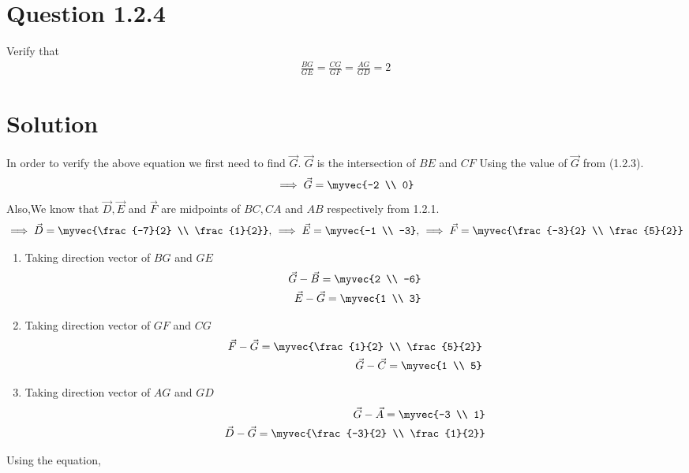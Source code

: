 \documentclass[journal,12pt,twocolumn]{IEEEtran}
\theoremstyle{remark}
\begin{document}
\section{Question 1.2.4}Verify that 
\begin{align}
		\frac{BG}{GE} = 
		\frac{CG}{GF} =
		\frac{AG}{GD} = 2 
\end{align}
\section{Solution}In order to verify the above equation we first need to find $\vec{G}$. 
$\vec{G}$ is the intersection of $BE$ and $CF$
Using the value of $\vec{G}$ from (1.2.3).
\begin{align}
		\implies\vec{G} = \myvec{-2 \\ 0}
\end{align}
Also,We know that $\vec{D}, \vec{E}$ and $\vec{F}$ are midpoints of $BC, CA$ and $AB$ respectively from 1.2.1.
\begin{align}
		\implies\vec{D} = \myvec{\frac{-7}{2} \\ \frac{1}{2}},\,
		\implies\vec{E} = \myvec{-1 \\ -3},\,
		\implies\vec{F} = \myvec{\frac{-3}{2} \\ \frac{5}{2}}
\end{align}
\begin{enumerate}
\item Taking direction vector of $BG$ and $GE$ 
\begin{align}
		\label{eq:tri-pts/4} \vec{G}-\vec{B} = \myvec{2 \\ -6} \\
		\label{eq:tri-pts/5} \vec{E}-\vec{G} = \myvec{1 \\ 3} \\
\end{align}		
\item Taking direction vector of $GF$ and $CG$
\begin{align}
		\label{eq:tri-pts/7} \vec{F}-\vec{G} = \myvec{\frac{1}{2} \\ \frac{5}{2}} \\
		\label{eq:tri-pts/8} \vec{G}-\vec{C} = \myvec{1 \\ 5} \\
\end{align}
\item Taking direction vector of $AG$ and $GD$
\begin{align}
		\label{eq:tri-pts/10} \vec{G}-\vec{A} = \myvec{-3 \\ 1} \\
		\label{eq:tri-pts/11} \vec{D}-\vec{G} = \myvec{\frac{-3}{2} \\ \frac{1}{2}}
\end{align}
\end{enumerate}
Using the equation,
 		
\end{document}
